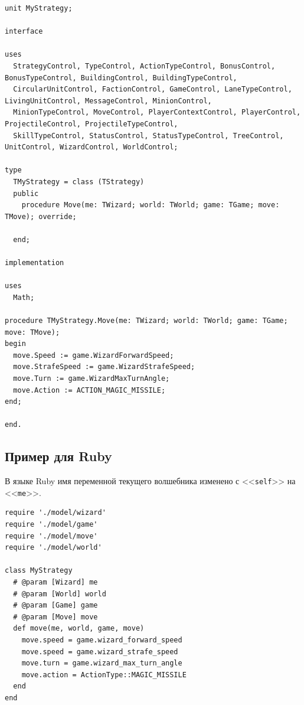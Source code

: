 \begin{verbatim}
unit MyStrategy;

interface

uses
  StrategyControl, TypeControl, ActionTypeControl, BonusControl, BonusTypeControl, BuildingControl, BuildingTypeControl,
  CircularUnitControl, FactionControl, GameControl, LaneTypeControl, LivingUnitControl, MessageControl, MinionControl,
  MinionTypeControl, MoveControl, PlayerContextControl, PlayerControl, ProjectileControl, ProjectileTypeControl,
  SkillTypeControl, StatusControl, StatusTypeControl, TreeControl, UnitControl, WizardControl, WorldControl;

type
  TMyStrategy = class (TStrategy)
  public
    procedure Move(me: TWizard; world: TWorld; game: TGame; move: TMove); override;

  end;

implementation

uses
  Math;
    
procedure TMyStrategy.Move(me: TWizard; world: TWorld; game: TGame; move: TMove);
begin
  move.Speed := game.WizardForwardSpeed;
  move.StrafeSpeed := game.WizardStrafeSpeed;
  move.Turn := game.WizardMaxTurnAngle;
  move.Action := ACTION_MAGIC_MISSILE;
end;

end.
\end{verbatim}

\newpage
\subsection{Пример для Ruby}

В языке Ruby имя переменной текущего волшебника изменено с <<\texttt{self}>> на <<\texttt{me}>>.

\begin{verbatim}
require './model/wizard'
require './model/game'
require './model/move'
require './model/world'

class MyStrategy
  # @param [Wizard] me
  # @param [World] world
  # @param [Game] game
  # @param [Move] move
  def move(me, world, game, move)
    move.speed = game.wizard_forward_speed
    move.speed = game.wizard_strafe_speed
    move.turn = game.wizard_max_turn_angle
    move.action = ActionType::MAGIC_MISSILE
  end
end
\end{verbatim}
